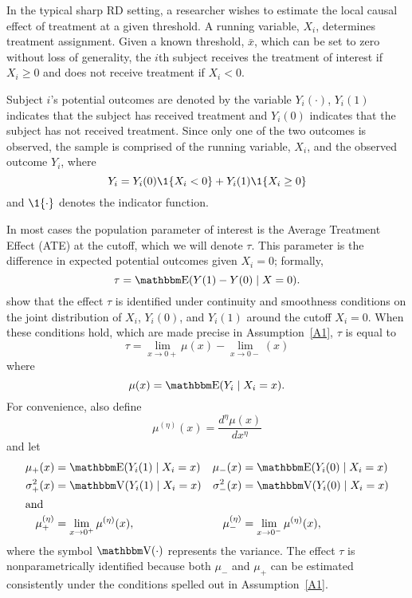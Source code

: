 \documentclass[12pt,fleqn]{article}
\begin{document}
In the typical sharp RD setting, a researcher wishes to estimate the local
causal effect of treatment at a given threshold. A running variable, $X_{i}$,
determines treatment assignment.  Given a known threshold, $\bar{x}$, which can
be set to zero without loss of generality, the $i$th subject receives the
treatment of interest if $X_{i} \geq 0$ and does not receive treatment if
$X_{i} < 0$.

Subject $i$'s potential outcomes are denoted by the variable $Y_i(\cdot)$,
$Y_i(1)$ indicates that the subject has received treatment and $Y_i(0)$
indicates that the subject has not received treatment. Since only one of the two
outcomes is observed, the sample is comprised of the running variable, $X_{i}$,
and the observed outcome $Y_i$, where
\begin{equation*}
  Y_{i}=Y_{i}(0) \1\{X_{i}<0\}+Y_{i}(1) \1\{X_{i} \geq 0\}
\end{equation*}
and $\1\{ \cdot\}$ denotes the indicator function.

In most cases the population parameter of interest is the Average Treatment
Effect (ATE) at the cutoff, which we will denote $\tau$. This parameter is the
difference in expected potential outcomes given $X_i = 0$; formally,
\begin{equation*}
  \tau=\E(Y(1)-Y(0) \mid X=0).
\end{equation*}
\cite{HTV2001} show that the effect $\tau$ is identified under continuity and
smoothness conditions on the joint distribution of $X_i$, $Y_i(0)$, and $Y_i(1)$
around the cutoff $X_i = 0$. When these conditions hold, which are made precise
in Assumption~\ref{A1}, $\tau$ is equal to
\begin{equation*}
  \tau = \lim_{x \to 0+} \mu(x) - \lim_{x \to 0-}(x)
\end{equation*}
where
\begin{equation*}
  \mu(x)= \E(Y_{i} \mid X_{i}=x).
\end{equation*}
For convenience, also define
\begin{equation*}
  \mu^{(\eta)}(x)=\frac{d^{\eta}\mu(x)}{dx^{\eta}}
\end{equation*}
and let
\begin{align*}
  \mu_{+}(x)
  &= \E( Y_{i}(1) \mid X_{i}=x )
  &\mu_{-}(x)
  &= \E( Y_{i}(0) \mid X_{i}=x ) \\
  \sigma^{2}_{+}(x) &= \V( Y_{i}(1) \mid X_{i}=x )
  &\sigma^{2}_{-}(x)&=\V( Y_{i}(0) \mid X_{i}=x ) \\
\intertext{and}
  \mu^{(\eta)}_{+}
  &= \lim_{x \rightarrow 0^{+}}\mu^{(\eta)}(x),
  &\mu^{(\eta)}_{-}
  &= \lim_{x \rightarrow 0^{-}}\mu^{(\eta)}(x),
\end{align*}
where the symbol $\V(\cdot)$ represents the variance.  The effect $\tau$ is
nonparametrically identified because both $\mu_-$ and $\mu_+$ can be estimated
consistently under the conditions spelled out in Assumption~\ref{A1}.
\end{document}
